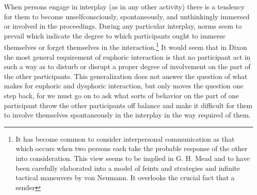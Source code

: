 \documentclass[openany,nobib]{tufte-book}
\begin{document}
When persons engage in interplay (as in any other activity) there is a
tendency for them to become unselfconsciously, spontaneously, and
unthinkingly immersed or involved in the proceedings. During any
particular interplay, norms seem to prevail which indicate the degree to
which participants ought to immerse themselves or forget themselves in
the interaction.\footnote{It has become common to consider interpersonal
  communication as that which occurs when two persons each take the
  probable response of the other into consideration. This view seems to
  be implied in G. H. Mead and to have been carefully elaborated into a
  model of feints and strategies and infinite tactical maneuvers by von
  Neumann. It overlooks the crucial fact that a sender} It would seem that in Dixon the most
general requirement of euphoric interaction is that no participant act
in such a way as to disturb or disrupt a proper degree of involvement on
the part of the other participants. This generalization does not answer
the question of what makes for euphoric and dysphoric interaction, but
only moves the question one step back, for we must go on to ask what
sorts of behavior on the part of one participant throw the other
participants off balance and make it difficult for them to involve
themselves spontaneously in the interplay in the way required of them.
\end{document}
